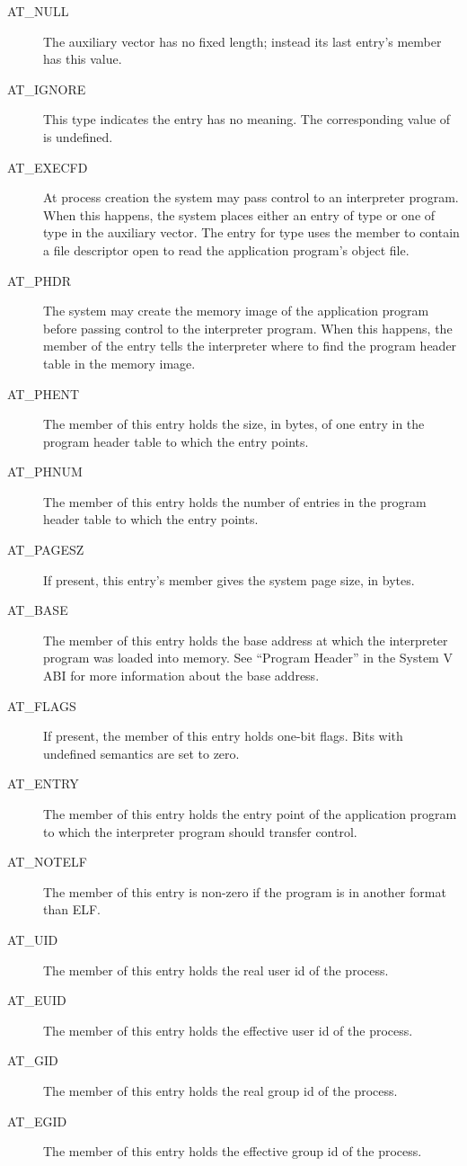 \begin{description}
\item[AT_NULL] The auxiliary vector has no fixed length; instead its
  last entry's  member has this value.
\item[AT_IGNORE] This type indicates the entry has no meaning. The
  corresponding value of  is undefined.
\item[AT_EXECFD] At process creation the system may pass control to an
  interpreter program. When this happens, the system places either an
  entry of type  or one of type  in the
  auxiliary vector. The entry for type  uses the
   member to contain a file descriptor open to read the
  application program's object file.
\item[AT_PHDR] The system may create the memory image of the
  application program before passing control to the interpreter program.
  When this happens, the  member of the 
  entry tells the interpreter where to find the program header table in
  the memory image.
\item[AT_PHENT] The  member of this entry holds the size,
  in bytes, of one entry in the program header table to which the
   entry points.
\item[AT_PHNUM] The  member of this entry holds the number of
  entries in the program header table to which the  entry
  points.
\item[AT_PAGESZ] If present, this entry's  member gives the
  system page size, in bytes.
\item[AT_BASE] The  member of this entry holds the base address
  at which the interpreter program was loaded into memory. See ``Program
  Header'' in the System V ABI for more information about the base
  address.
\item[AT_FLAGS] If present, the  member of this entry holds
  one-bit flags.  Bits with undefined semantics are set to zero.
\item[AT_ENTRY] The  member of this entry holds the entry point
  of the application program to which the interpreter program should
  transfer control.
\item[AT_NOTELF] The  member of this entry is non-zero if
  the program is in another format than ELF.
\item[AT_UID] The  member of this entry holds the real
  user id of the process.
\item[AT_EUID] The  member of this entry holds the
  effective user id of the process.
\item[AT_GID] The  member of this entry holds the
  real group id of the process.
\item[AT_EGID] The  member of this entry holds the
  effective group id of the process.
\end{description}


